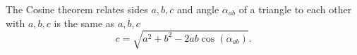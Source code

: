 The Cosine theorem relates sides $a, b, c$ and angle $\alpha_{ab}$ of a triangle to each other with
$a, b, c$ is the same as \begin{math}
    a, b, c
\end{math}
\[
  c = \sqrt{
    a^2 + b^2 - 2ab 
    \cos( \alpha_{ab} )
  }.
\]